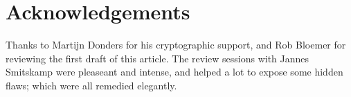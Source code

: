 \section*{Acknowledgements}
Thanks to Martijn Donders for his cryptographic support, and Rob Bloemer for reviewing the first draft of this article.
The review sessions with Jannes Smitskamp were pleaseant and intense,
and helped a lot to expose some hidden flaws;
which were all remedied elegantly.
